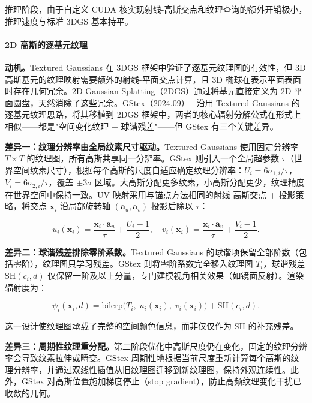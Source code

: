 推理阶段，由于自定义 CUDA 核实现射线-高斯交点和纹理查询的额外开销极小，推理速度与标准 3DGS 基本持平。

\paragraph{2D 高斯的逐基元纹理}

\textbf{动机。}Textured Gaussians 在 3DGS 框架中验证了逐基元纹理图的有效性，但 3D 高斯基元的纹理映射需要额外的射线-平面交点计算，且 3D 椭球在表示平面表面时存在几何冗余。2D Gaussian Splatting（2DGS）通过将基元直接定义为 2D 平面圆盘，天然消除了这些冗余。GStex（2024.09）~\cite{2409_12954} 沿用 Textured Gaussians 的逐基元纹理思路，将其移植到 2DGS 框架中，两者的核心辐射分解公式在形式上相似——都是"空间变化纹理 + 球谐残差"——但 GStex 有三个关键差异。

\textbf{差异一：纹理分辨率由全局纹素尺寸驱动。}Textured Gaussians 使用固定分辨率 $T \times T$ 的纹理图，所有高斯共享同一分辨率。GStex 则引入一个全局超参数 $\tau$（世界空间纹素尺寸），根据每个高斯的尺度自适应确定纹理分辨率：$U_i = 6\sigma_{1,i}/\tau$，$V_i = 6\sigma_{2,i}/\tau$，覆盖 $\pm 3\sigma$ 区域。大高斯分配更多纹素，小高斯分配更少，纹理精度在世界空间中保持一致。UV 映射采用与锚点方法相同的射线-高斯交点 + 投影策略，将交点 $\mathbf{x}_i$ 沿局部旋转轴 $(\mathbf{a}_u, \mathbf{a}_v)$ 投影后除以 $\tau$：

\begin{equation}
    u_i(\mathbf{x}_i) = \frac{\mathbf{x}_i \cdot \mathbf{a}_u}{\tau} + \frac{U_i - 1}{2}, \quad
    v_i(\mathbf{x}_i) = \frac{\mathbf{x}_i \cdot \mathbf{a}_v}{\tau} + \frac{V_i - 1}{2}.
\end{equation}

\textbf{差异二：球谐残差排除零阶系数。}Textured Gaussians 的球谐项保留全部阶数（包括零阶），纹理图只学习残差。GStex 则将零阶系数完全移入纹理图 $T_i$，球谐残差 $\mathrm{SH}(c_i, d)$ 仅保留一阶及以上分量，专门建模视角相关效果（如镜面反射）。渲染辐射度为：

\begin{equation}
    \psi_i(\mathbf{x}_i, d) = \mathrm{bilerp}\bigl(T_i,\; u_i(\mathbf{x}_i),\; v_i(\mathbf{x}_i)\bigr) + \mathrm{SH}(c_i, d).
\end{equation}

这一设计使纹理图承载了完整的空间颜色信息，而非仅仅作为 SH 的补充残差。

\textbf{差异三：周期性纹理重分配。}第二阶段优化中高斯尺度仍在变化，固定的纹理分辨率会导致纹素拉伸或畸变。GStex 周期性地根据当前尺度重新计算每个高斯的纹理分辨率，并通过双线性插值从旧纹理图迁移到新纹理图，保持外观连续性。此外，GStex 对高斯位置施加梯度停止（stop gradient），防止高频纹理变化干扰已收敛的几何。

